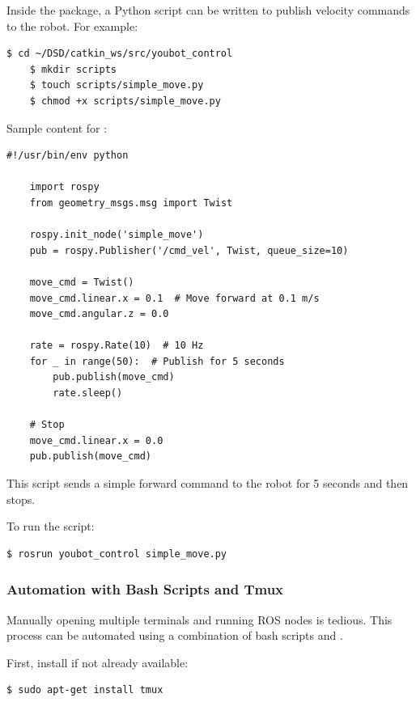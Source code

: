 \documentclass[a4paper, 12pt]{article}
\newcommand{\code}[1]{\texttt{\detokenize{#1}}}
\begin{document}
    Inside the package, a Python script can be written to publish velocity commands to the robot. For example:

    \begin{lstlisting}[style=plain]
    $ cd ~/DSD/catkin_ws/src/youbot_control
    $ mkdir scripts
    $ touch scripts/simple_move.py
    $ chmod +x scripts/simple_move.py
    \end{lstlisting}

    Sample content for \code{simple_move.py}:

    \begin{lstlisting}[style=plain]
    #!/usr/bin/env python

    import rospy
    from geometry_msgs.msg import Twist

    rospy.init_node('simple_move')
    pub = rospy.Publisher('/cmd_vel', Twist, queue_size=10)

    move_cmd = Twist()
    move_cmd.linear.x = 0.1  # Move forward at 0.1 m/s
    move_cmd.angular.z = 0.0

    rate = rospy.Rate(10)  # 10 Hz
    for _ in range(50):  # Publish for 5 seconds
        pub.publish(move_cmd)
        rate.sleep()

    # Stop
    move_cmd.linear.x = 0.0
    pub.publish(move_cmd)
    \end{lstlisting}

    This script sends a simple forward command to the robot for 5 seconds and then stops.

    To run the script:

    \begin{lstlisting}[style=plain]
    $ rosrun youbot_control simple_move.py
    \end{lstlisting}

    \subsubsection{Automation with Bash Scripts and Tmux}

    Manually opening multiple terminals and running ROS nodes is tedious. This process can be automated using a combination of bash scripts and \code{tmux}.

    First, install \code{tmux} if not already available:

    \begin{lstlisting}[style=plain]
    $ sudo apt-get install tmux
    \end{lstlisting}
\end{document}
